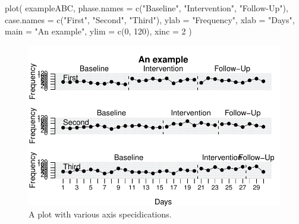 \documentclass[
  letterpaper,
  DIV=11,
  numbers=noendperiod]{scrreprt}
\newenvironment{Shaded}{\begin{snugshade}}{\end{snugshade}}
\newcommand{\AttributeTok}[1]{\textcolor[rgb]{0.40,0.45,0.13}{#1}}
\newcommand{\DecValTok}[1]{\textcolor[rgb]{0.68,0.00,0.00}{#1}}
\newcommand{\FunctionTok}[1]{\textcolor[rgb]{0.28,0.35,0.67}{#1}}
\newcommand{\NormalTok}[1]{\textcolor[rgb]{0.00,0.23,0.31}{#1}}
\newcommand{\StringTok}[1]{\textcolor[rgb]{0.13,0.47,0.30}{#1}}
\begin{document}
\begin{Shaded}
\begin{Highlighting}[]
\FunctionTok{plot}\NormalTok{(}
\NormalTok{  exampleABC,}
  \AttributeTok{phase.names =} \FunctionTok{c}\NormalTok{(}\StringTok{"Baseline"}\NormalTok{, }\StringTok{"Intervention"}\NormalTok{, }\StringTok{"Follow{-}Up"}\NormalTok{),}
  \AttributeTok{case.names =} \FunctionTok{c}\NormalTok{(}\StringTok{"First"}\NormalTok{, }\StringTok{"Second"}\NormalTok{, }\StringTok{"Third"}\NormalTok{),}
  \AttributeTok{ylab =} \StringTok{"Frequency"}\NormalTok{,}
  \AttributeTok{xlab =} \StringTok{"Days"}\NormalTok{,}
  \AttributeTok{main =} \StringTok{"An example"}\NormalTok{,}
  \AttributeTok{ylim =} \FunctionTok{c}\NormalTok{(}\DecValTok{0}\NormalTok{, }\DecValTok{120}\NormalTok{),}
  \AttributeTok{xinc =} \DecValTok{2}
\NormalTok{)}
\end{Highlighting}
\end{Shaded}

\begin{figure}[H]

{\centering \includegraphics{./ch_creating_a_plot_files/figure-pdf/ex-plot-axis-1.pdf}

}

\caption{A plot with various axis specidications.}

\end{figure}
\end{document}
